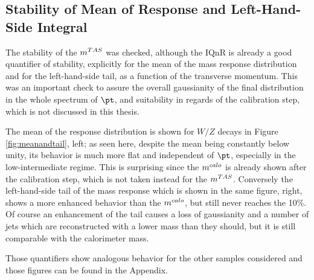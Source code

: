\subsection{Stability of Mean of Response and Left-Hand-Side Integral }
The stability of the $m^{TAS}$ was checked, although the IQnR is already a good quantifier of stability, explicitly for the mean of the mass response distribution and for the left-hand-side tail, as a function of the transverse momentum. This was an important check to assure the overall gaussianity of the final distribution in the whole spectrum of $\pt$, and suitability in regards of the calibration step, which is not discussed in this thesis.

The mean of the response distribution is shown for $W/Z$ decays in Figure \ref{fig:meanandtail}, left; as seen here, despite the mean being constantly below unity, its behavior is much more flat and independent of $\pt$, especially in the low-intermediate regime. This is surprising since the $m^{calo}$ is already shown after the calibration step, which is not taken instead for the $m^{TAS}$. Conversely the left-hand-side tail of the mass response which is shown in the same figure, right, shows a more enhanced behavior than the $m^{calo}$, but still never reaches the 10\%. Of course an enhancement of the tail causes a loss of gaussianity and a number of jets which are reconstructed with a lower mass than they should, but it is still comparable with the calorimeter mass.

Those quantifiers show analogous behavior for the other samples considered and those figures can be found in the Appendix.

